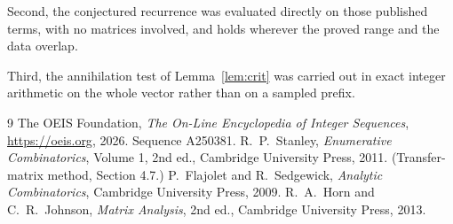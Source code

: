 \documentclass[11pt,a4paper]{article}
\theoremstyle{plain}
\theoremstyle{definition}
\begin{document}
Second, the conjectured recurrence was evaluated directly on those published terms, with no
matrices involved, and holds wherever the proved range and the data overlap.

Third, the annihilation test of Lemma~\ref{lem:crit} was carried out in exact integer
arithmetic on the whole vector rather than on a sampled prefix.

\begin{thebibliography}{9}
 The OEIS Foundation, \emph{The On-Line Encyclopedia of Integer
Sequences}, \url{https://oeis.org}, 2026. Sequence A250381.
 R.~P.~Stanley, \emph{Enumerative Combinatorics}, Volume 1, 2nd ed.,
Cambridge University Press, 2011. (Transfer-matrix method, Section 4.7.)
 P.~Flajolet and R.~Sedgewick, \emph{Analytic Combinatorics}, Cambridge
University Press, 2009.
 R.~A.~Horn and C.~R.~Johnson, \emph{Matrix Analysis}, 2nd ed., Cambridge
University Press, 2013.
\end{thebibliography}
\end{document}
